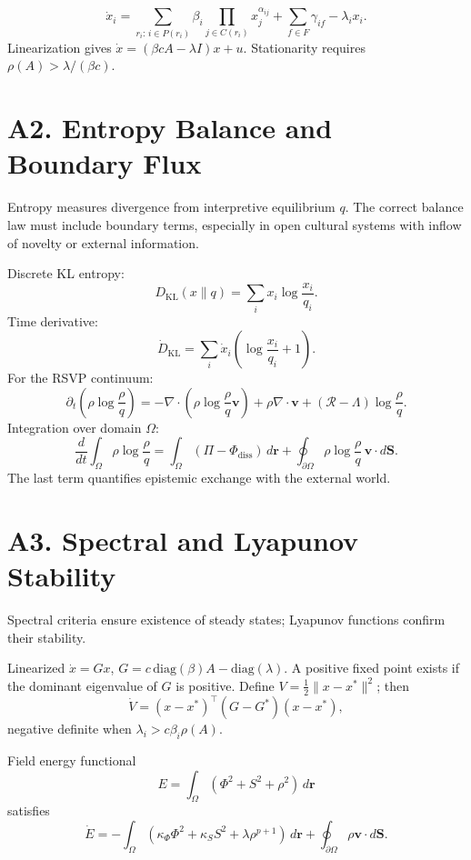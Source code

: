 \documentclass[11pt,a4paper]{article}
\newenvironment{narrative}{\begin{itshape}}{\end{itshape}}
\begin{document}
\[
\dot{x}_i = \sum_{r_i:\, i\in P(r_i)} 
\beta_i \!\!\!\!\!\!\!\!\!\!
\prod_{j\in C(r_i)}x_j^{\alpha_{ij}} 
+ \sum_{f\in F}\gamma_{if} - \lambda_i x_i .
\]
Linearization gives \(\dot{x}=(\beta cA-\lambda I)x+u\).
Stationarity requires \(\rho(A)>\lambda/(\beta c)\).

\section{A2. Entropy Balance and Boundary Flux}
\begin{narrative}
Entropy measures divergence from interpretive equilibrium \(q\).  
The correct balance law must include boundary terms, especially in open cultural systems with inflow of novelty or external information.
\end{narrative}

Discrete KL entropy:
\[
D_{\mathrm{KL}}(x\|q)=\sum_i x_i\log\frac{x_i}{q_i}.
\]
Time derivative:
\[
\dot D_{\mathrm{KL}}
=\sum_i\dot x_i(\log\frac{x_i}{q_i}+1).
\]
For the RSVP continuum:
\[
\partial_t(\rho\log\frac{\rho}{q})
=-\nabla\!\cdot\!(\rho\log\frac{\rho}{q}\mathbf v)
+\rho\nabla\!\cdot\!\mathbf v
+(\mathcal{R}-\Lambda)\log\frac{\rho}{q}.
\]
Integration over domain \(\Omega\):
\[
\frac{d}{dt}\!\int_\Omega\rho\log\frac{\rho}{q}
=\!\int_\Omega(\Pi-\Phi_{\text{diss}})\,d\mathbf r
+\!\oint_{\partial\Omega}\!\rho\log\frac{\rho}{q}\,\mathbf v\!\cdot\!d\mathbf S.
\]
The last term quantifies epistemic exchange with the external world.

\section{A3. Spectral and Lyapunov Stability}
\begin{narrative}
Spectral criteria ensure existence of steady states; Lyapunov functions confirm their stability.
\end{narrative}

Linearized \(\dot x=Gx\), \(G=c\,\mathrm{diag}(\beta)A-\mathrm{diag}(\lambda)\).
A positive fixed point exists if the dominant eigenvalue of \(G\) is positive.
Define \(V=\tfrac12\|x-x^*\|^2\); then
\[
\dot V=(x-x^*)^\top(G-G^*)(x-x^*),
\]
negative definite when \(\lambda_i>c\beta_i\rho(A)\).

Field energy functional
\[
E=\int_\Omega(\Phi^2+S^2+\rho^2)\,d\mathbf r
\]
satisfies
\[
\dot E=-\int_\Omega(\kappa_\Phi\Phi^2+\kappa_SS^2+\lambda\rho^{p+1})\,d\mathbf r
+\oint_{\partial\Omega}\rho\mathbf v\!\cdot\!d\mathbf S.
\]
\end{document}

